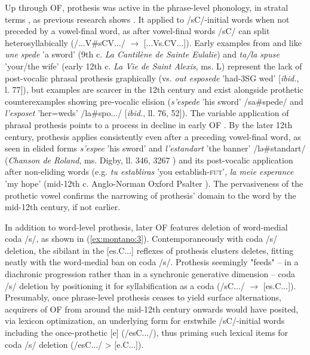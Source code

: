 \documentclass[output=paper,colorlinks,citecolor=brown,
]{langscibook}
\begin{document}
Up through OF, prothesis was active in the phrase-level phonology, in stratal terms \citep{Kiparsky2015}, as previous research shows \citep{Pope1952, Rohlfs1970, Sampson2010}.  It applied to /sC/-initial words when not preceded by a vowel-final word, as after vowel-final words /sC/ can split heterosyllabically (/...V\#sCV.../ $\rightarrow$ [...Vs.CV...]).  Early examples from \citet{Pope1952} and \citet{Sampson2010} like \textit{une spede} 'a sword' (9th c. \textit{La Cantilène de Sainte Eulalie}) and \textit{ta/la spuse} 'your/the wife' (early 12th c. \textit{La Vie de Saint Alexis}, ms. L) represent the lack of post-vocalic phrasal prothesis graphically (vs. \textit{out esposede} 'had-3SG wed' [\textit{ibid.}, l. 77]), but examples are scarcer in the 12th century and exist alongside prothetic counterexamples showing pre-vocalic elision (\textit{s'espede} 'his sword' \leftarrow /sa\#spede/ and \textit{l'esposet} 'her=weds' \leftarrow /la\#spo.../ [\textit{ibid.}, ll. 76, 52]).  The variable application of phrasal prothesis points to a process in decline in early OF \citep{Sampson2010}.  By the later 12th century, prothesis applies consistently even after a preceding vowel-final word, as seen in elided forms \textit{s'espee} 'his sword' and \textit{l'estandart} 'the banner' \leftarrow /lə\#standart/ (\textit{Chanson de Roland}, ms. Digby, ll. 346, 3267 \citep{Pope1952}) and its post-vocalic application after non-eliding words (e.g. \textit{tu establiras} 'you establish-\textsc{fut}', \textit{la meie esperance} 'my hope' (mid-12th c. Anglo-Norman Oxford Psalter \citep{Sampson2010}).  The pervasiveness of the prothetic vowel confirms the narrowing of prothesis' domain to the word by the mid-12th century, if not earlier.

In addition to word-level prothesis, later OF features deletion of word-medial coda /s/, as shown in (\ref{ex:montano:3}).  Contemporaneously with coda /s/ deletion, the sibilant in the [es.C...] reflexes of prothesis clusters deletes, fitting neatly with the word-medial ban on coda /s/.  Prothesis seemingly "feeds" – in a diachronic progression rather than in a synchronic generative dimension – coda /s/ deletion by positioning it for syllabification as a coda (/sC.../ $\rightarrow$ [es.C...]).  Presumably, once phrase-level prothesis ceases to yield surface alternations, acquirers of OF from around the mid-12th century onwards would have posited, via lexicon optimization, an underlying form for erstwhile /sC/-initial words including the once-prothetic [e] (/esC.../), thus priming such lexical items for coda /s/ deletion (/esC.../ > [e.C...]).
 
\end{document}
